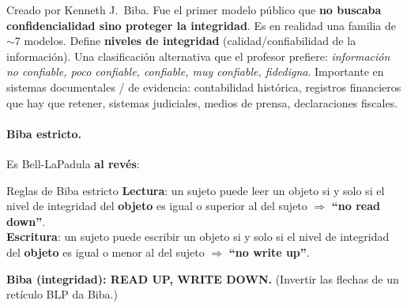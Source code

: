 \documentclass[../main.tex]{subfiles}
\begin{document}
Creado por Kenneth J.\ Biba. Fue el primer modelo público que \textbf{no buscaba confidencialidad sino proteger la integridad}. Es en realidad una familia de $\sim 7$ modelos. Define \textbf{niveles de integridad} (calidad/confiabilidad de la información). Una clasificación alternativa que el profesor prefiere: \emph{información no confiable, poco confiable, confiable, muy confiable, fidedigna}. Importante en sistemas documentales / de evidencia: contabilidad histórica, registros financieros que hay que retener, sistemas judiciales, medios de prensa, declaraciones fiscales.

\paragraph{Biba estricto.} Es Bell-LaPadula \textbf{al revés}:
\begin{definicion}{Reglas de Biba estricto}
\textbf{Lectura}: un sujeto puede leer un objeto si y solo si el nivel de integridad del \textbf{objeto} es igual o superior al del sujeto $\Rightarrow$ \textbf{``no read down''}.\\
\textbf{Escritura}: un sujeto puede escribir un objeto si y solo si el nivel de integridad del \textbf{objeto} es igual o menor al del sujeto $\Rightarrow$ \textbf{``no write up''}.
\end{definicion}

\begin{center}
\textbf{Biba (integridad): READ UP, WRITE DOWN.} (Invertir las flechas de un retículo BLP da Biba.)
\end{center}
\end{document}
